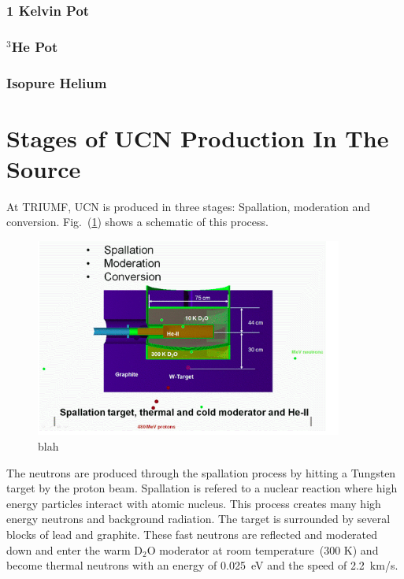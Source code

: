 \subsubsection{1 Kelvin Pot}

\subsubsection{$^3$He Pot}

\subsubsection{Isopure Helium}


\section{Stages of UCN Production In The Source}
At TRIUMF, UCN is produced in three stages: Spallation, moderation and
conversion. Fig.~(\ref{fig:ucn_production_stages}) shows a schematic of
this process.

\begin{figure}[h]
  \centering
  \includegraphics[width=0.9\textwidth]{ucn_production_stages.png}
  \caption{blah}
  \label{fig:ucn_production_stages}
\end{figure}

The neutrons are produced through the spallation process by hitting a
Tungsten target by the proton beam. Spallation is refered to a nuclear
reaction where high energy particles interact with atomic
nucleus. This process creates many high energy neutrons and background
radiation.  The target is surrounded by several blocks of lead and
graphite. These fast neutrons
are reflected and moderated down and enter the warm D$_2$O moderator at room temperature~(300 K) and become thermal
neutrons with an energy of 0.025~eV and the speed of 2.2~km/s.

